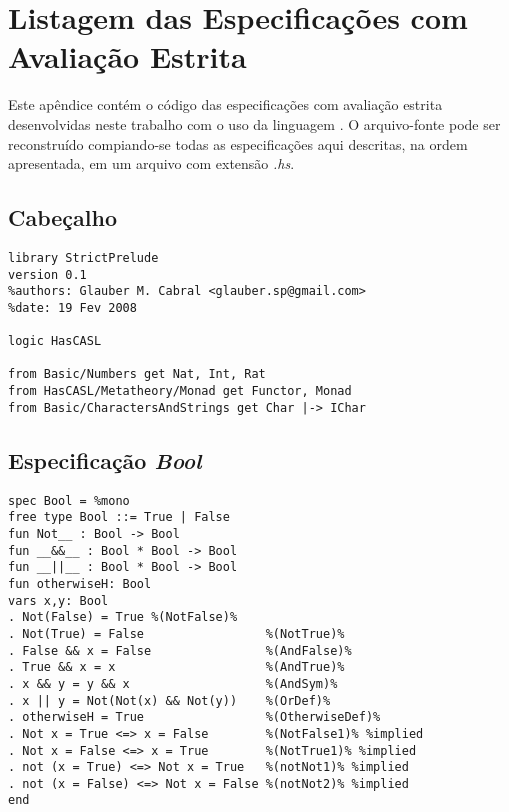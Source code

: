 \chapter{Listagem das Especificações com Avaliação Estrita}
\label{appendix:strictSpec}
Este apêndice contém o código das especificações com avaliação estrita desenvolvidas neste trabalho com o uso da linguagem \HasCASL.
O arquivo-fonte pode ser reconstruído compiando-se todas as especificações aqui descritas, na ordem apresentada, em um arquivo com extensão \textit{.hs}.

\section{Cabeçalho}
\label{appendix:strictSpec:header}
\begin{Verbatim}
library StrictPrelude
version 0.1
%authors: Glauber M. Cabral <glauber.sp@gmail.com>
%date: 19 Fev 2008

logic HasCASL 

from Basic/Numbers get Nat, Int, Rat
from HasCASL/Metatheory/Monad get Functor, Monad
from Basic/CharactersAndStrings get Char |-> IChar
\end{Verbatim}

\section{Especificação \textit{Bool}}
\label{appendix:strictSpec:bool}
\begin{Verbatim}
spec Bool = %mono
free type Bool ::= True | False 
fun Not__ : Bool -> Bool
fun __&&__ : Bool * Bool -> Bool
fun __||__ : Bool * Bool -> Bool
fun otherwiseH: Bool      
vars x,y: Bool
. Not(False) = True %(NotFalse)%
. Not(True) = False                 %(NotTrue)%
. False && x = False                %(AndFalse)%
. True && x = x                     %(AndTrue)%
. x && y = y && x                   %(AndSym)%
. x || y = Not(Not(x) && Not(y))    %(OrDef)%
. otherwiseH = True                 %(OtherwiseDef)% 
. Not x = True <=> x = False        %(NotFalse1)% %implied
. Not x = False <=> x = True        %(NotTrue1)% %implied
. not (x = True) <=> Not x = True   %(notNot1)% %implied
. not (x = False) <=> Not x = False %(notNot2)% %implied
end
\end{Verbatim}

